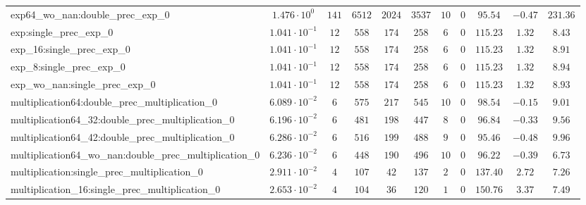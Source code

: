 \begin{tabular}{|l|c|c|c|c|c|c|c|c|c|c|}
exp64\_wo\_nan:double\_prec\_exp\_0                       & $ 1.476 \cdot 10^{0}  $ & $ 141    $ & $ 6512   $ & $ 2024  $ & $ 3537  $ & $ 10  $ & $ 0 $ & $ 95.54       $ & $ -0.47   $ & $ 231.36  $ \\
exp:single\_prec\_exp\_0                                  & $ 1.041 \cdot 10^{-1} $ & $ 12     $ & $ 558    $ & $ 174   $ & $ 258   $ & $ 6   $ & $ 0 $ & $ 115.23      $ & $ 1.32    $ & $ 8.43    $ \\
exp\_16:single\_prec\_exp\_0                              & $ 1.041 \cdot 10^{-1} $ & $ 12     $ & $ 558    $ & $ 174   $ & $ 258   $ & $ 6   $ & $ 0 $ & $ 115.23      $ & $ 1.32    $ & $ 8.91    $ \\
exp\_8:single\_prec\_exp\_0                               & $ 1.041 \cdot 10^{-1} $ & $ 12     $ & $ 558    $ & $ 174   $ & $ 258   $ & $ 6   $ & $ 0 $ & $ 115.23      $ & $ 1.32    $ & $ 8.94    $ \\
exp\_wo\_nan:single\_prec\_exp\_0                         & $ 1.041 \cdot 10^{-1} $ & $ 12     $ & $ 558    $ & $ 174   $ & $ 258   $ & $ 6   $ & $ 0 $ & $ 115.23      $ & $ 1.32    $ & $ 8.93    $ \\
multiplication64:double\_prec\_multiplication\_0          & $ 6.089 \cdot 10^{-2} $ & $ 6      $ & $ 575    $ & $ 217   $ & $ 545   $ & $ 10  $ & $ 0 $ & $ 98.54       $ & $ -0.15   $ & $ 9.01    $ \\
multiplication64\_32:double\_prec\_multiplication\_0      & $ 6.196 \cdot 10^{-2} $ & $ 6      $ & $ 481    $ & $ 198   $ & $ 447   $ & $ 8   $ & $ 0 $ & $ 96.84       $ & $ -0.33   $ & $ 9.56    $ \\
multiplication64\_42:double\_prec\_multiplication\_0      & $ 6.286 \cdot 10^{-2} $ & $ 6      $ & $ 516    $ & $ 199   $ & $ 488   $ & $ 9   $ & $ 0 $ & $ 95.46       $ & $ -0.48   $ & $ 9.96    $ \\
multiplication64\_wo\_nan:double\_prec\_multiplication\_0 & $ 6.236 \cdot 10^{-2} $ & $ 6      $ & $ 448    $ & $ 190   $ & $ 496   $ & $ 10  $ & $ 0 $ & $ 96.22       $ & $ -0.39   $ & $ 6.73    $ \\
multiplication:single\_prec\_multiplication\_0            & $ 2.911 \cdot 10^{-2} $ & $ 4      $ & $ 107    $ & $ 42    $ & $ 137   $ & $ 2   $ & $ 0 $ & $ 137.40      $ & $ 2.72    $ & $ 7.26    $ \\
multiplication\_16:single\_prec\_multiplication\_0        & $ 2.653 \cdot 10^{-2} $ & $ 4      $ & $ 104    $ & $ 36    $ & $ 120   $ & $ 1   $ & $ 0 $ & $ 150.76      $ & $ 3.37    $ & $ 7.49    $ \\

\end{tabular}
